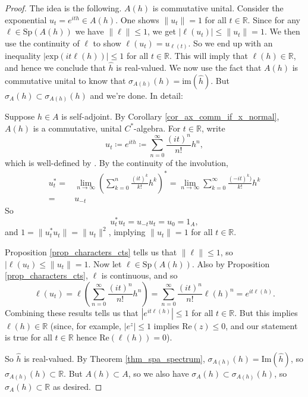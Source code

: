 \documentclass[12pt]{article}
\begin{document}
\begin{proof}
	The idea is the following. $A(h)$ is commutative unital. Consider the exponential $u_t = e^{ith}\in A(h)$. One shows $\|u_t\|=1$ for all $t\in\mathbb{R}$. Since for any $\ell\in\text{Sp}(A(h))$ we have $\|\ell\|\leq 1$, we get $|\ell(u_t)|\leq \|u_t\|=1$. We then use the continuity of $\ell$ to show $\ell(u_t)=u_{\ell(t)}$. So we end up with an inequality $|\text{exp}(it\ell(h))|\leq 1$ for all $t\in\mathbb{R}$. This will imply that $\ell(h)\in\mathbb{R}$, and hence we conclude that $\hat{h}$ is real-valued. We now use the fact that $A(h)$ is commutative unital to know that $\sigma_{A(h)}(h)=\text{im}(\hat{h})$. But $\sigma_A(h)\subset\sigma_{A(h)}(h)$ and we're done. In detail:

	Suppose $h\in A$ is self-adjoint. By Corollary \ref{cor_ax_comm_if_x_normal}, $A(h)$ is a commutative, unital $C^\ast$-algebra. For $t\in \mathbb{R}$, write 
	\begin{equation*}
		u_t \coloneqq e^{ith} \coloneqq \sum_{n=0}^\infty \frac{(it)^n}{n!}h^n,
	\end{equation*}
	which is well-defined by . By the continuity of the involution,
	\begin{align*}
		u_t^\ast 
		=& \lim_{n\to\infty}\left(\sum_{k=0}^n\frac{(it)^k}{k!}h^k\right)^\ast = \lim_{n\to\infty}\sum_{k=0}^\infty \frac{(-it)^k)}{k!}h^k \\
		=& u_{-t}
	\end{align*}
	So 
	\begin{equation*}
		u_t^\ast u_t = u_{-t}u_t = u_0 = 1_A,
	\end{equation*}
	and $1 = \|u_t^\ast u_t\| = \|u_t\|^2$, implying $\|u_t\|=1$ for all $t\in\mathbb{R}$. 

	Proposition \ref{prop_characters_cts} tells us that $\|\ell\|\leq 1$, so $|\ell(u_t) \leq \|u_t\| = 1$. Now let $\ell\in\text{Sp}(A(h))$. Also by Proposition \ref{prop_characters_cts}, $\ell$ is continuous, and so 
	\begin{equation*}
		\ell(u_t) 
		= \ell\left( \sum_{n=0}^\infty \frac{(it)^n}{n!}h^n \right) 
		= \sum_{n=0}^\infty \frac{(it)^n}{n!}\ell(h)^n 
		= e^{it\ell(h)}.
	\end{equation*}
	Combining these results tells us that $|e^{it\ell(h)}|\leq 1$ for all $t\in\mathbb{R}$. But this implies $\ell(h)\in\mathbb{R}$ (since, for example, $|e^z|\leq 1$ implies $\text{Re}(z)\leq 0$, and our statement is true for all $t\in\mathbb{R}$ hence $\text{Re}(\ell(h))=0$). 

	So $\hat{h}$ is real-valued. By Theorem \ref{thm_spa_spectrum}, $\sigma_{A(h)}(h)=\text{Im}(\hat{h})$, so $\sigma_{A(h)}(h)\subset\mathbb{R}$. But $A(h)\subset A$, so we also have $\sigma_A(h)\subset\sigma_{A(h)}(h)$, so $\sigma_A(h)\subset\mathbb{R}$ as desired.
\end{proof}
\end{document}
